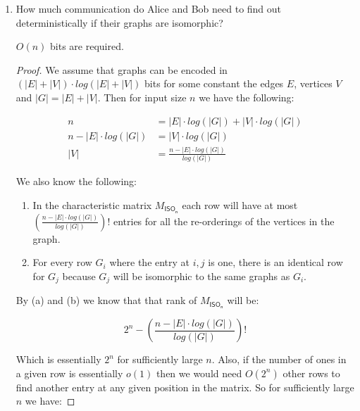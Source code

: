 \documentclass[usletter]{article}
\begin{document}

\begin{enumerate}
  \item How much communication do Alice and Bob need to find out deterministically if their graphs are isomorphic?

    \begin{claim}
      $O(n)$ bits are required.
    \end{claim}

    \begin{proof}
      We assume that graphs can be encoded in $(|E| + |V|) \cdot log(|E| + |V|)$ bits for some constant the edges $E$, vertices $V$ and $|G| = |E| + |V|$. Then for input size $n$ we have the following:

      \begin{align*}
        n &= |E| \cdot log(|G|) + |V| \cdot log(|G|) \\
        n - |E| \cdot log(|G|) &= |V| \cdot log(|G|) \\
       |V| &= \frac{n - |E| \cdot log(|G|)}{log(|G|)}
      \end{align*}

      We also know the following:

      \begin{enumerate}
        \item In the characteristic matrix $M_{\mathsf{ISO_n}}$ each row will have at most $\left (\frac{n - |E| \cdot log(|G|)}{log(|G|)}\right)!$ entries for all the re-orderings of the vertices in the graph.
        \item For every row $G_i$ where the entry at $i,j$ is one, there is an identical row for $G_j$ because $G_j$ will be isomorphic to the same graphs as $G_i$.
      \end{enumerate}

      By (a) and (b) we know that that rank of $M_{\mathsf{ISO_n}}$ will be:

      \begin{equation}
        2^n - \left (\frac{n - |E| \cdot log(|G|)}{log(|G|)}\right)!
      \end{equation}

      Which is essentially $2^n$ for sufficiently large $n$. Also, if the number of ones in a given row is essentially $o(1)$ then we would need $O(2^n)$ other rows to find another entry at any given position in the matrix. So for sufficiently large $n$ we have:


\end{proof}
\end{enumerate}
\end{document}
